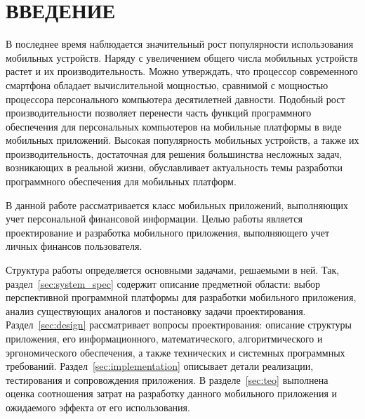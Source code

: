 \section*{ВВЕДЕНИЕ}

В последнее время наблюдается значительный рост
популярности использования мобильных устройств.
Наряду с увеличением общего числа мобильных
устройств растет и их производительность.
Можно утверждать, что процессор современного смартфона обладает
вычислительной мощностью, сравнимой с мощностью процессора
персонального компьютера десятилетней давности.
Подобный рост производительности позволяет перенести часть функций
программного обеспечения для персональных компьютеров
на мобильные платформы в виде мобильных приложений.
Высокая популярность мобильных устройств, а также
их производительность, достаточная для решения большинства
несложных задач, возникающих в реальной жизни, обуславливает
актуальность темы разработки программного обеспечения
для мобильных платформ.

В данной работе рассматривается класс мобильных приложений,
выполняющих учет персональной финансовой информации.
Целью работы является проектирование и разработка мобильного приложения,
выполняющего учет личных финансов пользователя.

Структура работы определяется основными задачами, решаемыми в ней.
Так, раздел~\ref{sec:system_spec} содержит описание предметной области:
выбор перспективной программной платформы для разработки мобильного
приложения, анализ существующих аналогов и постановку задачи проектирования.
Раздел~\ref{sec:design} рассматривает вопросы проектирования:
описание структуры приложения, его информационного, математического,
алгоритмического и эргономического обеспечения,
а также технических и системных программных требований.
Раздел~\ref{sec:implementation} описывает детали реализации,
тестирования и сопровождения приложения.
В разделе~\ref{sec:teo} выполнена оценка соотношения затрат
на разработку данного мобильного приложения и ожидаемого эффекта
от его использования.
